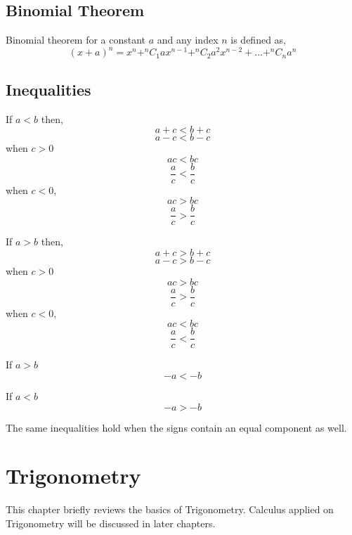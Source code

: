 \documentclass[a4paper]{book}
\begin{document}
\section{Binomial Theorem}
Binomial theorem for a constant $a$ and any index $n$ is defined as,
\begin{equation}
(x + a)^{n} = x^{n} + ^{n}C_{1}ax^{n - 1} + ^{n}C_{2}a^{2}x^{n - 2} + ... + ^{n}C_{n}a^{n}
\end{equation}

\section{Inequalities}
\begin{description}
\item If $a < b$ then,
\begin{equation}
a + c < b + c
\end{equation}
\begin{equation}
a - c < b - c
\end{equation}
when $c > 0$
\begin{equation}
ac < bc
\end{equation}
\begin{equation}
\frac{a}{c} < \frac{b} {c}
\end{equation}
when $c < 0$,
\begin{equation}
ac > bc
\end{equation}
\begin{equation}
\frac{a}{c} > \frac{b} {c}
\end{equation}

\item If $a > b$ then,
\begin{equation}
a + c > b + c
\end{equation}
\begin{equation}
a - c > b - c
\end{equation}
when $c > 0$
\begin{equation}
ac > bc
\end{equation}
\begin{equation}
\frac{a}{c} > \frac{b} {c}
\end{equation}
when $c < 0$,
\begin{equation}
ac < bc
\end{equation}
\begin{equation}
\frac{a}{c} < \frac{b} {c}
\end{equation}
\item If $a > b$
\begin{equation}
-a < -b
\end{equation}
\item If $a < b$
\begin{equation}
-a > -b
\end{equation}
\end{description}
The same inequalities hold when the signs contain an equal component as well.


\chapter{Trigonometry}
This chapter briefly reviews the basics of Trigonometry. Calculus applied on Trigonometry will be discussed in later chapters.
\end{document}
